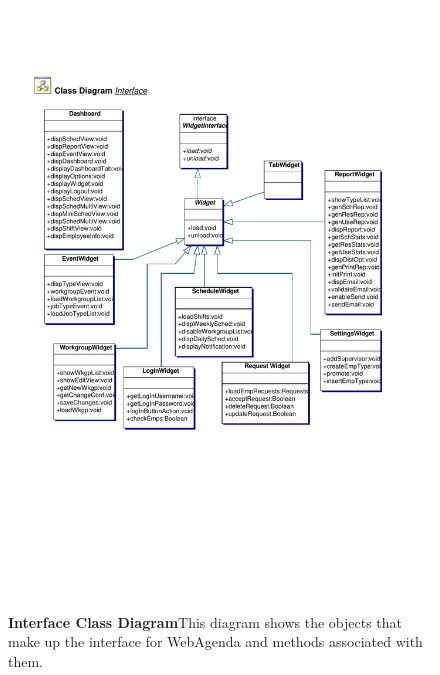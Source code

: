 \documentclass[letterpaper,12pt]{report}
\begin{document}
\begin{figure}[interfaceClassDia]
 \centering
 \includegraphics[scale=0.7,trim=20mm 40mm 25mm 50mm]{externals/InterfaceClassDiagram.pdf}
 \caption{\small
\textbf{Interface Class Diagram}\newline This diagram shows the objects that make up the interface for WebAgenda and methods associated with them. }\label{fig:intclassdia}
\end{figure}
\newpage
\end{document}
